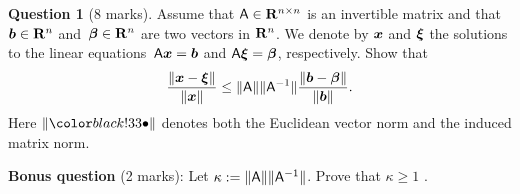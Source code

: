 \documentclass[11pt]{article}
\theoremstyle{definition}
\newtheorem{question}{Question}
\begin{document}
\newpage
\begin{question}
    [8 marks]
    Assume that $\mathsf A \in \mathbf R^{n \times n}$ is an invertible matrix
    and that $\mathbf{\boldsymbol{b}} \in \mathbf R^n$ and~$\mathbf{\boldsymbol{\beta}} \in \mathbf R^n$ are two vectors in $\mathbf R^n$.
    We denote by $\mathbf{\boldsymbol{x}}$ and $\mathbf{\boldsymbol{\xi}}$ the solutions to the linear equations~$\mathsf A \mathbf{\boldsymbol{x}} = \mathbf{\boldsymbol{b}}$ and $\mathsf A \mathbf{\boldsymbol{\xi}} = \mathbf{\boldsymbol{\beta}}$,
    respectively.
    Show that
    \[
        \frac{\lVert\mathbf{\boldsymbol{x}} - \mathbf{\boldsymbol{\xi}}\rVert}{\lVert\mathbf{\boldsymbol{x}}\rVert} \leq \lVert\mathsf A\rVert \lVert\mathsf A^{-1}\rVert \frac{\lVert\mathbf{\boldsymbol{b}} - \mathbf{\boldsymbol{\beta}}\rVert}{\lVert\mathbf{\boldsymbol{b}}\rVert}.
    \]
    Here $\norm{\placeholder}$ denotes both the Euclidean vector norm and the induced matrix norm.

    \noindent \textbf{Bonus question} (2 marks): Let $\kappa := \lVert\mathsf A\rVert \lVert\mathsf A^{-1}\rVert$. Prove that $\kappa \geq 1$ .
\end{question}
\end{document}
